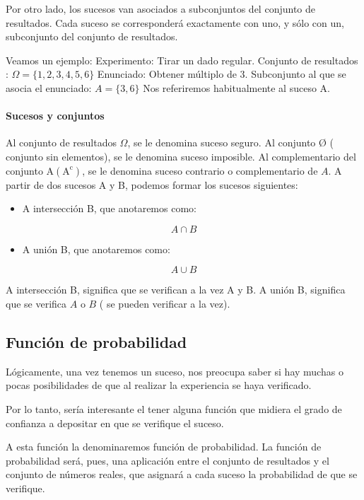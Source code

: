\documentclass[
]{article}
\providecommand{\tightlist}{%
  \setlength{\itemsep}{0pt}\setlength{\parskip}{0pt}}
\begin{document}
Por otro lado, los sucesos van asociados a subconjuntos del conjunto de
resultados. Cada suceso se corresponderá exactamente con uno, y sólo con
un, subconjunto del conjunto de resultados.

Veamos un ejemplo: Experimento: Tirar un dado regular. Conjunto de
resultados : \(\Omega=\{1,2,3,4,5,6\}\) Enunciado: Obtener múltiplo de 3.
Subconjunto al que se asocia el enunciado: \(A=\{3,6\}\) Nos referiremos
habitualmente al suceso A.

\paragraph{Sucesos y conjuntos}\label{sucesos-y-conjuntos}

Al conjunto de resultados \(\Omega\), se le denomina suceso seguro. Al
conjunto Ø ( conjunto sin elementos), se le denomina suceso imposible.
Al complementario del conjunto
\(\mathrm{A}\left(\mathrm{A}^{\mathrm{c}}\right)\), se le denomina suceso
contrario o complementario de \(A\). A partir de dos sucesos A y B,
podemos formar los sucesos siguientes:

\begin{itemize}
\tightlist
\item
  A intersección B, que anotaremos como:
\end{itemize}

\[
A \cap B
\]

\begin{itemize}
\tightlist
\item
  A unión B, que anotaremos como:
\end{itemize}

\[
A \cup B
\]

A intersección B, significa que se verifican a la vez A y B. A unión B,
significa que se verifica \(A\) o \(B\) ( se pueden verificar a la vez).

\subsection{Función de probabilidad}\label{funciuxf3n-de-probabilidad}

Lógicamente, una vez tenemos un suceso, nos preocupa saber si hay muchas
o pocas posibilidades de que al realizar la experiencia se haya
verificado.

Por lo tanto, sería interesante el tener alguna función que midiera el
grado de confianza a depositar en que se verifique el suceso.

A esta función la denominaremos función de probabilidad. La función de
probabilidad será, pues, una aplicación entre el conjunto de resultados
y el conjunto de números reales, que asignará a cada suceso la
probabilidad de que se verifique.
\end{document}
